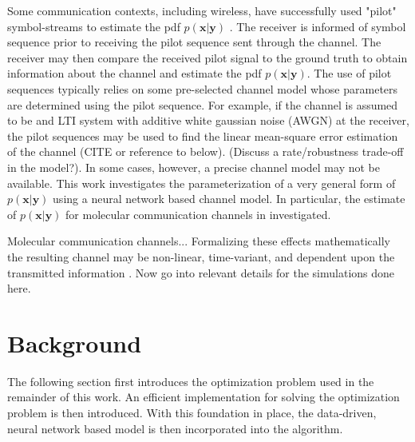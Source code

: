 \documentclass[12pt,a4paper]{report}
\begin{document}
\par
Some communication contexts, including wireless, have successfully used "pilot" symbol-streams to estimate the pdf $p(\mathbf{x}|\mathbf{y})$ \cite{van1995channel}. The receiver is informed of symbol sequence prior to receiving the pilot sequence sent through the channel. The receiver may then compare the received pilot signal to the ground truth to obtain information about the channel and estimate the pdf $p(\mathbf{x}|\mathbf{y})$.
The use of pilot sequences typically relies on some pre-selected channel model whose parameters are determined using the pilot sequence. For example, if the channel is assumed to be and LTI system with additive white gaussian noise (AWGN) at the receiver, the pilot sequences may be used to find the linear mean-square error estimation of the channel (CITE or reference to below). (Discuss a rate/robustness trade-off in the model?). In some cases, however, a precise channel model may not be available. This work investigates the parameterization of a very general form of $p(\mathbf{x}|\mathbf{y})$ using a neural network based channel model. In particular, the estimate of $p(\mathbf{x}|\mathbf{y})$ for molecular communication channels in investigated.
\par
Molecular communication channels...
Formalizing these effects mathematically the resulting channel may be non-linear, time-variant, and dependent upon the transmitted information \cite{jamali2019channel}. 
Now go into relevant details for the simulations done here. 




\par



\section{Background}
The following section first introduces the optimization problem used in the remainder of this work. An efficient implementation for solving the optimization problem is then introduced. With this foundation in place, the data-driven, neural network based model is then incorporated into the algorithm. 
\end{document}
